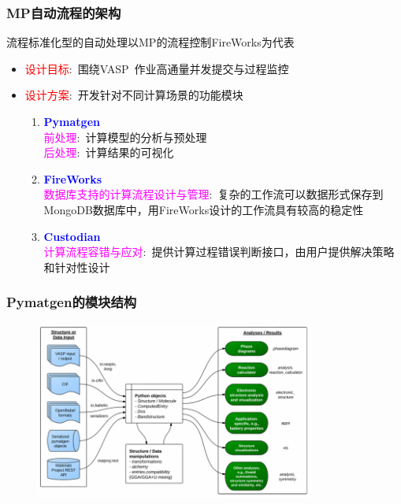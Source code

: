 \frame
{
	\frametitle{\textrm{MP}自动流程的架构}
流程标准化型的自动处理以\textrm{MP}的流程控制\textrm{FireWorks}为代表
	\begin{itemize}
		\item \textcolor{red}{设计目标}:~围绕\textrm{VASP~}作业高通量并发提交与过程监控
		\item \textcolor{red}{设计方案}:~开发针对不同计算场景的功能模块
			\begin{enumerate}
    \setlength{\itemsep}{7pt}
				\item \textcolor{blue}{\textbf{Pymatgen}}\\
					\textcolor{magenta}{前处理}:~计算模型的分析与预处理\\
					\textcolor{magenta}{后处理}:~计算结果的可视化
				\item \textcolor{blue}{\textbf{FireWorks}}\\
					\textcolor{magenta}{数据库支持的计算流程设计与管理}:~复杂的工作流可以数据形式保存到\textrm{MongoDB}数据库中，用\textrm{FireWorks}设计的工作流具有较高的稳定性
				\item \textcolor{blue}{\textbf{Custodian}}\\
\textcolor{magenta}{计算流程容错与应对}:~提供计算过程错误判断接口，由用户提供解决策略和针对性设计
			\end{enumerate}
	\end{itemize}
}

\frame
{
	\frametitle{\textrm{Pymatgen}的模块结构}
\begin{figure}[h!]
\centering
\vspace*{-0.1in}
\includegraphics[height=2.3in]{Figures/MP_library.png}
\caption{\fontsize{7.2pt}{4.2pt}}%
\label{Pymatgen_Lib}
\end{figure} 
}

